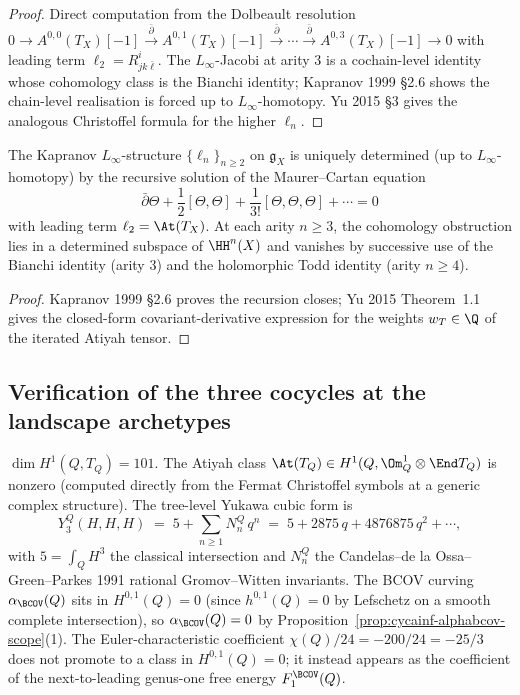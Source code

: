 \begin{proof}
Direct computation from the Dolbeault resolution
$0 \to A^{0,0}(T_X)[-1] \xrightarrow{\bar\partial} A^{0,1}(T_X)[-1]
\xrightarrow{\bar\partial} \cdots \xrightarrow{\bar\partial} A^{0,3}(T_X)[-1]
\to 0$ with leading term $\ell_2 = R^i_{j k \bar \ell}$. The
$L_\infty$-Jacobi at arity $3$ is a cochain-level identity whose
cohomology class is the Bianchi identity; Kapranov 1999 \S 2.6 shows
the chain-level realisation is forced up to $L_\infty$-homotopy.
Yu 2015 \S 3 gives the analogous Christoffel formula for the higher
$\ell_n$.
\end{proof}

\begin{proposition}
\label{prop:cycainf-ell-n-recursion}
The Kapranov $L_\infty$-structure $\{\ell_n\}_{n \geq 2}$ on $\mathfrak
g_X$ is uniquely determined (up to $L_\infty$-homotopy) by the recursive
solution of the Maurer--Cartan equation
\[
 \bar\partial \Theta + \frac{1}{2}[\Theta, \Theta] +
 \frac{1}{3!}[\Theta, \Theta, \Theta] + \cdots = 0
\]
with leading term $\ell_2 = \At(T_X)$. At each arity $n \geq 3$, the
cohomology obstruction lies in a determined subspace of $\HH^n(X)$
and vanishes by successive use of the Bianchi identity (arity $3$) and
the holomorphic Todd identity (arity $n \geq 4$).
\end{proposition}

\begin{proof}
Kapranov 1999 \S 2.6 proves the recursion closes; Yu 2015 Theorem~1.1
gives the closed-form covariant-derivative expression for the weights
$w_T \in \Q$ of the iterated Atiyah tensor.
\end{proof}

\subsection{Verification of the three cocycles at the landscape archetypes}
\label{subsec:cycainf-three-cocycles-archetypes}

\begin{example}
\label{ex:cycainf-quintic-three-cocycles}
$\dim H^1(Q, T_Q) = 101$. The Atiyah class $\At(T_Q) \in H^1(Q, \Om^1_Q
\otimes \End T_Q)$ is nonzero (computed directly from the Fermat
Christoffel symbols at a generic complex structure). The tree-level
Yukawa cubic form is
\[
 Y_3^Q(H, H, H) \;=\; 5 + \sum_{n \geq 1} N_n^Q \, q^n \;=\;
 5 + 2875\, q + 4876875\, q^2 + \cdots,
\]
with $5 = \int_Q H^3$ the classical intersection and $N_n^Q$ the
Candelas--de la Ossa--Green--Parkes 1991 rational Gromov--Witten
invariants. The BCOV curving $\alpha_{\BCOV}(Q)$ sits in $H^{0,1}(Q) = 0$
(since $h^{0,1}(Q) = 0$ by Lefschetz on a smooth complete
intersection), so $\alpha_{\BCOV}(Q) = 0$ by
Proposition~\ref{prop:cycainf-alphabcov-scope}(1). The
Euler-characteristic coefficient
$\chi(Q)/24 = -200/24 = -25/3$ does not promote to a class in
$H^{0,1}(Q) = 0$; it instead appears as the coefficient of the
next-to-leading genus-one free energy $F_1^{\BCOV}(Q)$.
\end{example}

